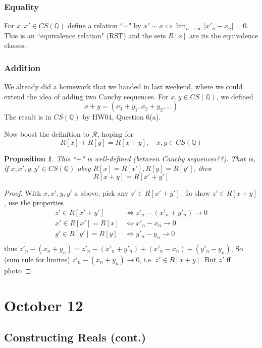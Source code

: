 \documentclass{article}
\theoremstyle{plain}
\newtheorem{proposition}{Proposition}
\theoremstyle{remark}
\newcommand{\Q}{{\mathbb Q}}
\begin{document}
\subsubsection{Equality}
For $x,x' \in CS(\Q)$ define a relation ``$\sim$" by
$x' \sim x \iff \lim_{n\to\infty}|x'_n - x_n| = 0$.
This is an ``equivalence relation" (RST)
and the sets $R[x]$ are its the equivalence classes.

\subsubsection{Addition}
We already did a homework that we handed in last weekend,
where we could extend the idea of adding two Cauchy sequences.
For $x,y \in CS(\Q)$, we defined
\[
	x + y = (x_1 + y_1, x_2 + y_2, \dots)
\]
The result is in $CS(\Q)$ by HW04, Question 6(a).

Now boost the definition to $\mathcal{R}$, hoping for
\[
	R[x] + R[y] = R[x+y], \quad x,y\in CS(\Q)
\]
\begin{proposition}
	This ``$+$" is well-defined (between Cauchy sequences??).
	That is, if $x,x',y,y' \in CS(\Q)$ obey $R[x]=R[x'], R[y]=R[y']$,
	then
	\[
		R[x+y] = R[x'+y']
	\]
\end{proposition}
\begin{proof}
	With $x,x',y,y'$ a above,
	pick any $z' \in R[x'+y']$.
	To show $z' \in R[x+y]$, use the properties
	\begin{align*}
		z' \in R[x'+y'] &\iff z'_n-(x'_n+y'_n) \to 0\\
		x' \in R[x'] = R[x] &\iff x'_n - x_n \to 0\\
		y' \in R[y'] = R[y] &\iff y'_n - y_n \to 0\\
	\end{align*}
	thus $z'_n - (x_n + y_n) = z'_n - (x'_n+y'_n) + (x'_n-x_n) + (y'_n-y_n)$,
	So (sum rule for limites) $z'_n - (x_n + y_n) \to 0$,
	i.e. $z' \in R[x+y]$.
	But $z'$ ff photo
\end{proof}

\section{October 12}
\subsection{Constructing Reals (cont.)}
\end{document}
